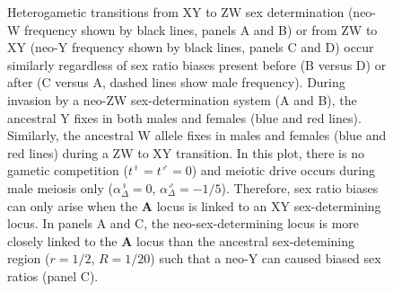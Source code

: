 \documentclass[12pt]{article}
\begin{document}
\begin{figure}[!h]
\centering
{}
\caption{
Heterogametic transitions from XY to ZW sex determination (neo-W frequency shown by black lines, panels A and B) or from ZW to XY (neo-Y frequency shown by black lines, panels C and D) occur similarly regardless of sex ratio biases present before (B versus D) or after (C versus A, dashed lines show male frequency). 
During invasion by a neo-ZW sex-determination system (A and B), the ancestral Y fixes in both males and females (blue and red lines). 
Similarly, the ancestral W allele fixes in males and females (blue and red lines) during a ZW to XY transition. 
In this plot, there is no gametic competition ($t^\female=t^\male=0$) and meiotic drive occurs during male meiosis only ($\alpha^\female_{\Delta}=0$, $\alpha^\male_{\Delta}=-1/5$). Therefore, sex ratio biases can only arise when the \textbf{A} locus is linked to an XY sex-determining locus.
In panels A and C, the neo-sex-determining locus is more closely linked to the \textbf{A} locus than the ancestral sex-detemining region ($r=1/2$, $R=1/20$) such that a neo-Y can caused biased sex ratios (panel C).
}
\end{figure}
\end{document}
